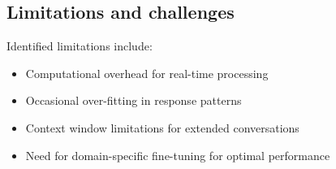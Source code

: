 \subsection{Limitations and challenges}

Identified limitations include:
\begin{itemize}
    \item Computational overhead for real-time processing
    \item Occasional over-fitting in response patterns
    \item Context window limitations for extended conversations
    \item Need for domain-specific fine-tuning for optimal performance
\end{itemize}
